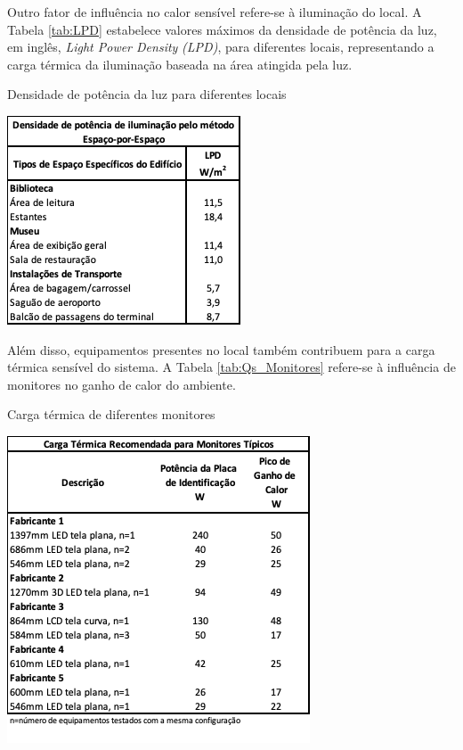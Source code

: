 \documentclass[acronym,symbols,table]{fei}
\begin{document}
Outro fator de influência no calor sensível refere-se à iluminação do local. A Tabela \ref{tab:LPD} estabelece valores máximos da densidade de potência da luz, em inglês, \textit{Light Power Density} \textit{(LPD)}, para diferentes locais, representando a carga térmica da iluminação baseada na área atingida pela luz.

\begin{table}[!htb] 
 \centering
    \caption{Densidade de potência da luz para diferentes locais}
    \includegraphics[width=0.6\linewidth]{Tabelas/LPD.png}
    \label{tab:LPD}
\end{table}

Além disso, equipamentos presentes no local também contribuem para a carga térmica sensível do sistema. A Tabela \ref{tab:Qs_Monitores} refere-se à influência de monitores no ganho de calor do ambiente.

\begin{table}[!htb] 
 \centering
    \caption{Carga térmica de diferentes monitores}
    \includegraphics[width=0.6\linewidth]{Tabelas/Qs_Monitores.png}
    \label{tab:Qs_Monitores}
\end{table}
\end{document}
